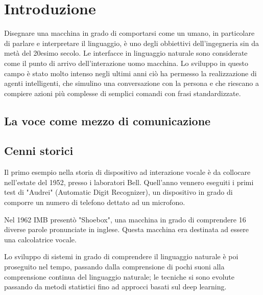 \documentclass[twoside]{supsistudent}
\begin{document}
\maketitle
\onehalfspacing
\frontmatter



\newpage
\mainmatter
{}
\setcounter{page}{1}

\chapter{Introduzione}

Disegnare una macchina in grado di comportarsi come un umano, in particolare di parlare e interpretare il linguaggio\color{red}, \color{black}  è uno degli obbiettivi dell'ingegneria sin da metà del 20esimo secolo. Le interfacce in linguaggio naturale  sono considerate come il punto di arrivo dell'interazione uomo macchina.
Lo sviluppo in questo campo è stato molto intenso negli ultimi anni ciò ha permesso la realizzazione di agenti intelligenti, che simulino una conversazione con la persona e che riescano a compiere azioni più complesse di semplici comandi con frasi standardizzate.

\section{La voce come mezzo di comunicazione}


\section{Cenni storici}

Il primo esempio nella storia di dispositivo ad interazione vocale è da collocare nell'estate del 1952, presso i laboratori Bell.
Quell'anno vennero eseguiti i primi test di "Audrei" (Automatic Digit Recognizer), un dispositivo in grado di comporre un numero di telefono dettato ad un microfono.

Nel 1962 IMB presentò "Shoebox", una macchina in grado di comprendere 16 diverse parole pronunciate in inglese. Questa macchina era destinata ad essere una calcolatrice vocale.

Lo sviluppo di sistemi in grado di comprendere il linguaggio naturale è poi proseguito nel tempo, passando dalla comprensione di pochi suoni alla comprensione continua del linguaggio naturale; le tecniche si sono evolute passando da metodi statistici fino ad approcci basati sul deep learning.
\end{document}
